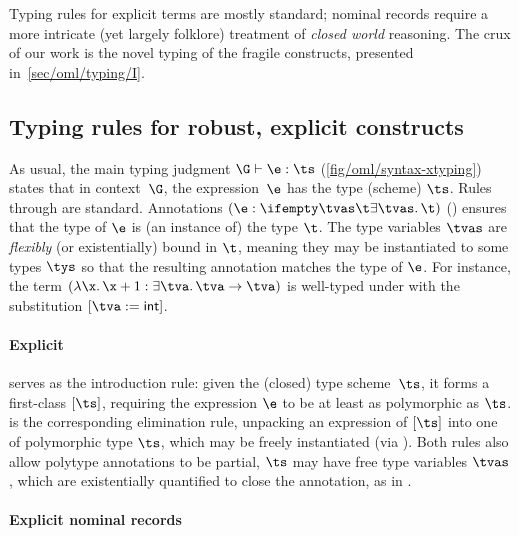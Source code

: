 \documentclass[acmsmall,screen,nonacm%
\Anonymous{,anonymous}{}%
\Final{}{,review}%
]{acmart}
\begin{document}

Typing rules for explicit terms are mostly standard; nominal
records require a more intricate (yet largely folklore) treatment of
\emph{closed world} reasoning.
%
The crux of our work is the novel typing of the fragile constructs,
presented in~\cref {sec/oml/typing/I}.

\subsection{Typing rules for robust, explicit constructs}
\label{sec/oml/typing/X}


As usual, the main typing judgment $\G \th \e : \ts$
(\cref{fig/oml/syntax-xtyping}) states that in context~$\G$, the expression~$\e$
has the type (scheme) $\ts$.
%
Rules  through  are standard. Annotations $\eannot \e \tvs
\t$ () ensures that the type of $\e$ is (an instance of) the type
$\t$. The type variables $\tvs$ are \emph{flexibly} (or existentially) bound in
$\t$, meaning they may be instantiated to some types $\tys$ so that the
resulting annotation matches the type of $\e$. For instance, the term $(\efun
\x \x + 1 : \exi \tv \tv \to \tv)$ is well-typed under  with the
substitution $\where {\tv \is \tint}$.


\paragraph {Explicit \polytypes}

 serves as the introduction rule: given the (closed) type
scheme~$\ts$, it forms a first-class \polytype $\tpoly \ts$, requiring the
expression
$\e$ to be at least as polymorphic as $\ts$.  is the
corresponding
elimination rule, unpacking an expression of \polytype $\tpoly \ts$ into
one of polymorphic type $\ts$,
which may be freely instantiated (via ). Both rules also allow
polytype annotations to be partial, \ie $\ts$ may have free type variables
$\tvs$, which are existentially quantified to close the annotation, as in
.


\paragraph{Explicit nominal records}
\label {app/typing/X/records}
\end{document}
